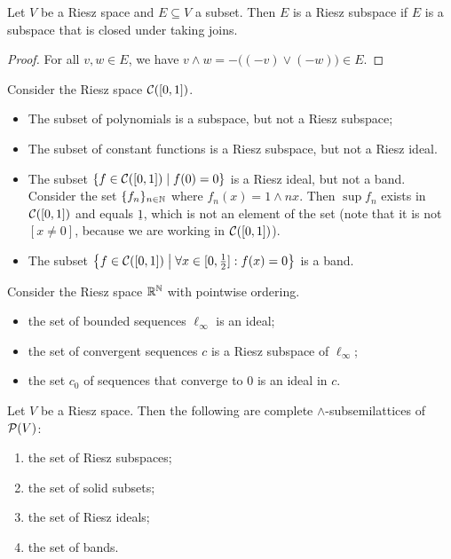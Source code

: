 \begin{lemma} \label{RieszSubspaceJoinClosure}
Let $V$ be a Riesz space and $E\subseteq V$ a subset. Then $E$ is a Riesz subspace if $E$ is a subspace that is closed under taking joins.
\end{lemma}
\begin{proof}
For all $v,w\in E$, we have $v\wedge w = -\big((-v)\vee (-w)\big)\in E$.
\end{proof}

\begin{example}
Consider the Riesz space $\cont(\interval{0,1})$.
\begin{itemize}
\item The subset of polynomials is a subspace, but not a Riesz subspace;
\item The subset of constant functions is a Riesz subspace, but not a Riesz ideal.
\item The subset $\setbuilder{f\in \cont(\interval{0,1})}{f(0) = 0}$ is a Riesz ideal, but not a band. Consider the set $\{f_n\}_{n\in\mathbb{N}}$ where $f_n(x) = 1 \wedge nx$. Then $\sup f_n$ exists in $\cont(\interval{0,1})$ and equals $\underline{1}$, which is not an element of the set (note that it is not $[x\neq 0]$, because we are working in $\cont(\interval{0,1})$).
\item The subset $\setbuilder{f\in \cont(\interval{0,1})}{\forall x\in \interval{0,\frac{1}{2}}: f(x) = 0}$ is a band. 
\end{itemize}
Consider the Riesz space $\mathbb{R}^{\mathbb{N}}$ with pointwise ordering.
\begin{itemize}
\item the set of bounded sequences $\ell_\infty$ is an ideal;
\item the set of convergent sequences $c$ is a Riesz subspace of $\ell_\infty$;
\item the set $c_0$ of sequences that converge to $0$ is an ideal in $c$.
\end{itemize}
\end{example}

\begin{proposition} \label{RieszSpaceIntersectionSystems}
Let $V$ be a Riesz space. Then the following are complete $\wedge$-subsemilattices of $\operatorname{\mathcal{P}}(V)$:
\begin{enumerate}
\item the set of Riesz subspaces;
\item the set of solid subsets;
\item the set of Riesz ideals;
\item the set of bands.
\end{enumerate}
\end{proposition}

